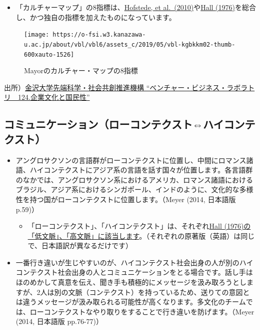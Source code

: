 \documentclass[
]{book}
\providecommand{\tightlist}{%
  \setlength{\itemsep}{0pt}\setlength{\parskip}{0pt}}
\begin{document}
\begin{itemize}
\tightlist
\item
  「カルチャーマップ」の8指標は、\protect\hyperlink{hofstede}{Hofstede, et al.~(2010)}や\protect\hyperlink{hall}{Hall (1976)}を総合し、かつ独自の指標を加えたものになっています。
\end{itemize}

\begin{figure}
\texttt{[image: https://o-fsi.w3.kanazawa-u.ac.jp/about/vbl/vbl6/assets\_c/2019/05/vbl-kgbkkm02-thumb-600xauto-1526]} \caption{Mayorのカルチャー・マップの8指標}\label{fig:unnamed-chunk-4}
\end{figure}

出所）\href{https://o-fsi.w3.kanazawa-u.ac.jp/about/vbl/vbl6/post/124.html}{金沢大学先端科学・社会共創推進機構 ``ベンチャー・ビジネス・ラボラトリ　124.企業文化と国民性''}

\hypertarget{ux30b3ux30dfux30e5ux30cbux30b1ux30fcux30b7ux30e7ux30f3ux30edux30fcux30b3ux30f3ux30c6ux30afux30b9ux30c8ux30cfux30a4ux30b3ux30f3ux30c6ux30afux30b9ux30c8}{%
\subsection{コミュニケーション（ローコンテクスト⇔ハイコンテクスト）}\label{ux30b3ux30dfux30e5ux30cbux30b1ux30fcux30b7ux30e7ux30f3ux30edux30fcux30b3ux30f3ux30c6ux30afux30b9ux30c8ux30cfux30a4ux30b3ux30f3ux30c6ux30afux30b9ux30c8}}

\begin{itemize}
\item
  アングロサクソンの言語群がローコンテクストに位置し、中間にロマンス諸語、ハイコンテクストにアジア系の言語を話す国々が位置します。各言語群のなかでは、アングロサクソン系におけるアメリカ、ロマンス諸語におけるブラジル、アジア系におけるシンガポール、インドのように、文化的な多様性を持つ国がローコンテクストに位置します。（Meyer (2014, 日本語版 p.59)）

  \begin{itemize}
  \tightlist
  \item
    「ローコンテクスト」、「ハイコンテクスト」は、それぞれ\protect\hyperlink{hall}{Hall (1976)の「低文脈」、「高文脈」に該当します}。（それぞれの原著版（英語）は同じで、日本語訳が異なるだけです）\\
  \end{itemize}
\item
  一番行き違いが生じやすいのが、ハイコンテクスト社会出身の人が別のハイコンテクスト社会出身の人とコミュニケーションをとる場合です。話し手はほのめかして真意を伝え、聞き手も積極的にメッセージを汲み取ろうとしますが、2人は別の文脈（コンテクスト）を持っているため、送りての意図とは違うメッセージが汲み取られる可能性が高くなります。多文化のチームでは、ローコンテクストなやり取りをすることで行き違いを防げます。（Meyer (2014, 日本語版 pp.76-77)）
\end{itemize}
\end{document}
